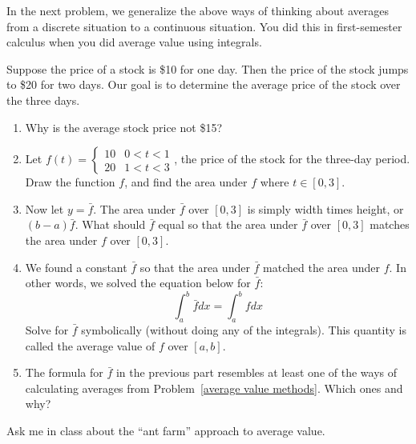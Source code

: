 In the next problem, we generalize the above ways of thinking about averages from a discrete situation to a continuous situation.  You did this in first-semester calculus when you did average value using integrals.

\begin{problem}
 Suppose the price of a stock is \$10 for one day.  Then the price of the stock jumps to \$20 for two days.  Our goal is to determine the average price of the stock over the three days.
\begin{enumerate}
 \item Why is the average stock price not \$15?
 \item Let $f(t) = \begin{cases}10 &0<t<1\\20&1<t<3\end{cases}$, the price of the stock for the three-day period. Draw the function $f$, and find the area under $f$ where $t\in[0,3]$.
 \item Now let $y=\bar f$.  The area under $\bar f$ over $[0,3]$ is simply width times height, or $(b-a)\bar f$. What should $\bar f$ equal so that the area under $\bar f$ over $[0,3]$ matches the area under $f$ over $[0,3]$.
 \item We found a constant $\bar f$ so that the area under $\bar f$ matched the area under $f$. In other words, we solved the equation below for $\bar f$: 
$$\int_a^b \bar f dx = \int_a^b f dx$$
  Solve for $\bar f$ symbolically (without doing any of the integrals). This quantity is called the average value of $f$ over $[a,b]$.%
\item {}%
 The formula for $\bar f$ in the previous part resembles at least one of the ways of calculating averages from Problem~\ref{average value methods}.  Which ones and why?
\end{enumerate}
\end{problem}

%
Ask me in class about the ``ant farm'' approach to average value. 

